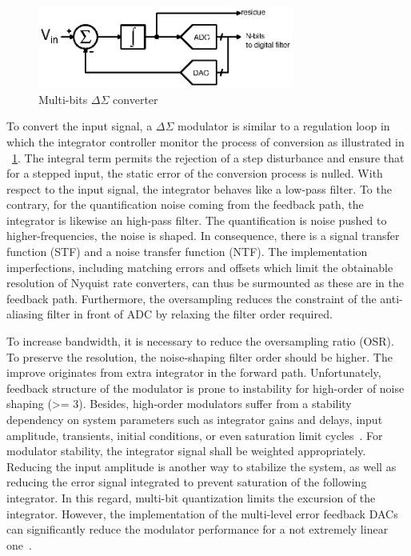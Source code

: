 \begin{figure}[htp]
	\centering
	\includegraphics[width=0.75\textwidth]{Chapter2/Figs/Vector/sigma-delta.ps}
	\caption{Multi-bits $\Delta\Sigma$ converter}
	\label{fig:multi-bit}
\end{figure}

To convert the input signal, a $\Delta\Sigma$ modulator is similar to a regulation loop in which the integrator controller monitor the process of conversion as illustrated in \figurename~\ref{fig:multi-bit}. The integral term permits the rejection of a step disturbance and ensure that for a stepped input, the static error of the conversion process is nulled. With respect to the input signal, the integrator behaves like a low-pass filter. To the contrary, for the quantification noise coming from the feedback path, the integrator is likewise an high-pass filter. The quantification is noise pushed to higher-frequencies, the noise is shaped. In consequence, there is a signal transfer function (STF) and a noise transfer function (NTF). The implementation imperfections, including matching errors and offsets which limit the obtainable resolution of Nyquist rate converters, can thus be surmounted as these are in the feedback path. Furthermore, the oversampling reduces the constraint of the anti-aliasing filter in front of ADC by relaxing the filter order required.

To increase bandwidth, it is necessary to reduce the oversampling ratio (OSR). To preserve the resolution, the noise-shaping filter order should be higher. The improve originates from extra integrator in the forward path. Unfortunately, feedback structure of the modulator is prone to instability for high-order of noise shaping (>= 3). Besides, high-order modulators suffer from a stability dependency on system parameters such as integrator gains and delays, input amplitude, transients, initial conditions, or even saturation limit cycles~\cite{Hein1993,Baird1994,Steven1996}. For modulator stability, the integrator signal shall be weighted appropriately. Reducing the input amplitude is another way to stabilize the system, as well as reducing the error signal integrated to prevent saturation of the following integrator. In this regard, multi-bit quantization limits the excursion of the integrator. However, the implementation of the multi-level error feedback DACs can significantly reduce the modulator performance for a not extremely linear one~\cite{Medeiro1999}.


